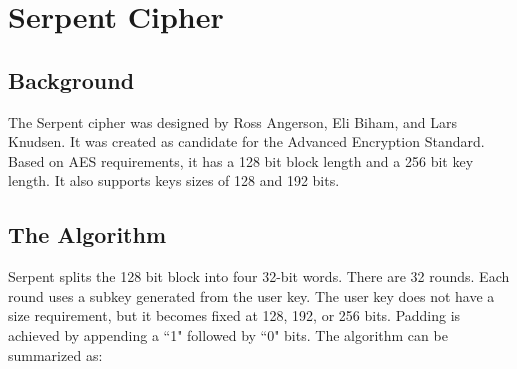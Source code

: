 \documentclass[12pt]{article} %
\begin{document}

\tableofcontents %

\newpage %


\section{Serpent Cipher} %


\subsection{Background} %
The Serpent cipher was designed by Ross Angerson, Eli Biham, and Lars Knudsen. It was created as candidate for the Advanced Encryption Standard. Based on AES requirements, it has a 128 bit block length and a 256 bit key length. It also supports keys sizes of 128 and 192 bits. 


\subsection{The Algorithm} %
Serpent splits the 128 bit block into four 32-bit words. There are 32 rounds. Each round uses a subkey generated from the user key. The user key does not have a size requirement, but it becomes fixed at 128, 192, or 256 bits. Padding is achieved by appending a ``1" followed by ``0" bits. The algorithm can be summarized as:
\end{document}
